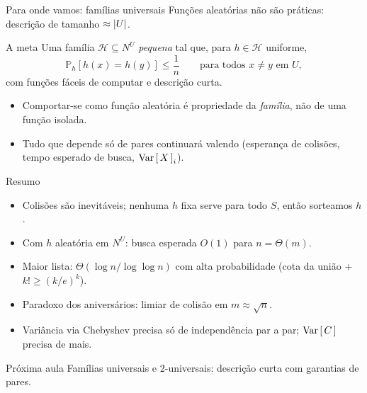 \documentclass[aspectratio=169,11pt]{beamer}
\newcommand{\PP}{\mathbb P}
\begin{document}
\begin{frame}{Para onde vamos: famílias universais}
  Funções aleatórias não são práticas: descrição de tamanho $\approx\lvert U\rvert$.
  \pause
  \begin{block}{A meta}
    Uma família $\mathcal H\subseteq N^U$ \emph{pequena} tal que, para
    $h\in\mathcal H$ uniforme,
    \[
      \PP_{h}[h(x)=h(y)]\le\frac1n\qquad\text{para todos }x\neq y\text{ em }U,
    \]
    com funções fáceis de computar e descrição curta.
  \end{block}
  \pause
  \begin{itemize}
  \item Comportar-se como função aleatória é propriedade da \emph{família},
    não de uma função isolada.
  \item Tudo que depende só de pares continuará valendo (esperança de
    colisões, tempo esperado de busca, $\Var X_i$).
  \end{itemize}
\end{frame}

\begin{frame}{Resumo}
  \begin{itemize}
  \item Colisões são inevitáveis; nenhuma $h$ fixa serve para todo $S$, então
    \alert{sorteamos $h$}.
  \item Com $h$ aleatória em $N^U$: busca esperada $O(1)$ para $n=\Theta(m)$.
  \item Maior lista: $\Theta(\log n/\log\log n)$ com alta probabilidade
    (cota da união + $k!\ge(k/e)^k$).
  \item Paradoxo dos aniversários: limiar de colisão em $m\approx\sqrt n$.
  \item Variância via Chebyshev precisa só de independência par a par; $\Var C$
    precisa de mais.
  \end{itemize}
  \vspace{0.5em}
  \begin{alertblock}{Próxima aula}
    Famílias universais e $2$-universais: descrição curta com garantias de
    pares.
  \end{alertblock}
\end{frame}
\end{document}
